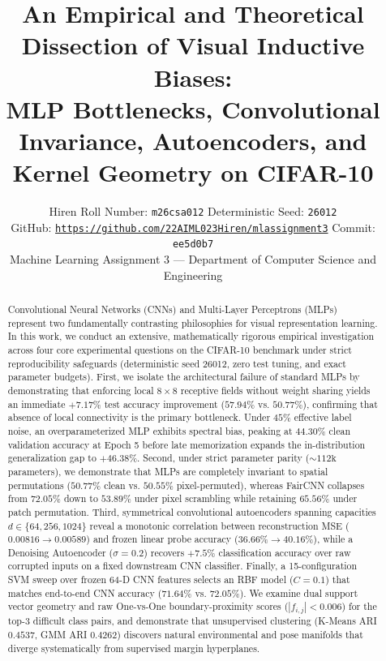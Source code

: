 \documentclass[10pt,twocolumn,letterpaper]{article}
\title{An Empirical and Theoretical Dissection of Visual Inductive Biases:\\MLP Bottlenecks, Convolutional Invariance, Autoencoders, and Kernel Geometry on CIFAR-10}
\author{
Hiren \quad Roll Number: \texttt{m26csa012} \quad Deterministic Seed: \texttt{26012}\\
GitHub: \href{https://github.com/22AIML023Hiren/mlassignment3}{\texttt{https://github.com/22AIML023Hiren/mlassignment3}} \quad Commit: \texttt{ee5d0b7}\\
Machine Learning Assignment 3 — Department of Computer Science and Engineering
}
\begin{document}
\maketitle

\begin{abstract}
Convolutional Neural Networks (CNNs) and Multi-Layer Perceptrons (MLPs) represent two fundamentally contrasting philosophies for visual representation learning. In this work, we conduct an extensive, mathematically rigorous empirical investigation across four core experimental questions on the CIFAR-10 benchmark under strict reproducibility safeguards (deterministic seed 26012, zero test tuning, and exact parameter budgets). First, we isolate the architectural failure of standard MLPs by demonstrating that enforcing local $8 \times 8$ receptive fields without weight sharing yields an immediate $+7.17\%$ test accuracy improvement ($57.94\%$ vs. $50.77\%$), confirming that absence of local connectivity is the primary bottleneck. Under $45\%$ effective label noise, an overparameterized MLP exhibits spectral bias, peaking at $44.30\%$ clean validation accuracy at Epoch 5 before late memorization expands the in-distribution generalization gap to $+46.38\%$. Second, under strict parameter parity ($\sim 112\text{k}$ parameters), we demonstrate that MLPs are completely invariant to spatial permutations ($50.77\%$ clean vs. $50.55\%$ pixel-permuted), whereas FairCNN collapses from $72.05\%$ down to $53.89\%$ under pixel scrambling while retaining $65.56\%$ under patch permutation. Third, symmetrical convolutional autoencoders spanning capacities $d \in \{64, 256, 1024\}$ reveal a monotonic correlation between reconstruction MSE ($0.00816 \to 0.00589$) and frozen linear probe accuracy ($36.66\% \to 40.16\%$), while a Denoising Autoencoder ($\sigma=0.2$) recovers $+7.5\%$ classification accuracy over raw corrupted inputs on a fixed downstream CNN classifier. Finally, a 15-configuration SVM sweep over frozen 64-D CNN features selects an RBF model ($C=0.1$) that matches end-to-end CNN accuracy ($71.64\%$ vs. $72.05\%$). We examine dual support vector geometry and raw One-vs-One boundary-proximity scores ($|f_{i,j}| < 0.006$) for the top-3 difficult class pairs, and demonstrate that unsupervised clustering (K-Means ARI $0.4537$, GMM ARI $0.4262$) discovers natural environmental and pose manifolds that diverge systematically from supervised margin hyperplanes.
\end{abstract}









{\small


}
\end{document}
